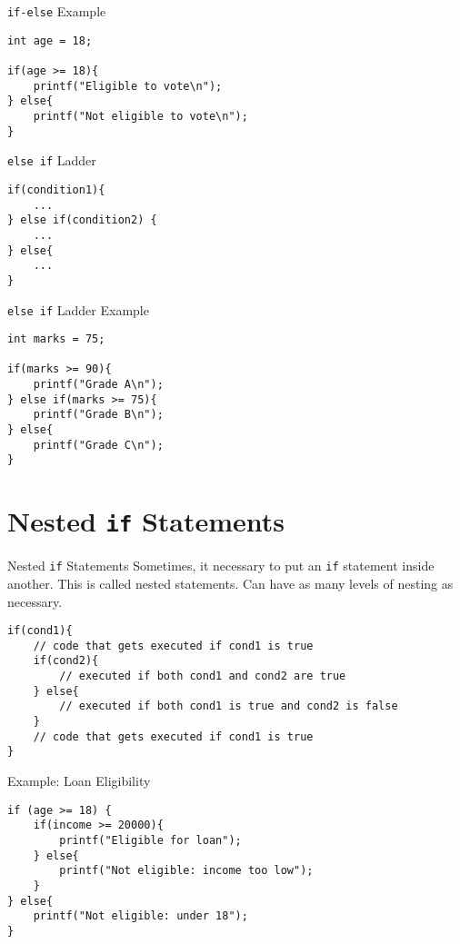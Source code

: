 \documentclass[12pt, aspectratio=169]{beamer}
\begin{document}
    \begin{frame}[fragile]{\texttt{if-else} Example}
        \begin{verbatim}
int age = 18;

if(age >= 18){
    printf("Eligible to vote\n");
} else{
    printf("Not eligible to vote\n");
}
        \end{verbatim}
    \end{frame}


    \begin{frame}[fragile]{\texttt{else if} Ladder}
        \begin{verbatim}
if(condition1){
    ...
} else if(condition2) {
    ...
} else{
    ...
}
        \end{verbatim}
    \end{frame}


    \begin{frame}[fragile]{\texttt{else if} Ladder Example}
        \begin{verbatim}
int marks = 75;

if(marks >= 90){
    printf("Grade A\n");
} else if(marks >= 75){
    printf("Grade B\n");
} else{
    printf("Grade C\n");
}
        \end{verbatim}
    \end{frame}


    \section{Nested \texttt{if} Statements}

    \begin{frame}[fragile]{Nested \texttt{if} Statements}
        Sometimes, it necessary to put an \texttt{if} statement inside another. This is called nested statements. Can have as many levels of nesting as necessary.

        \begin{verbatim}
if(cond1){
    // code that gets executed if cond1 is true
    if(cond2){
        // executed if both cond1 and cond2 are true
    } else{
        // executed if both cond1 is true and cond2 is false
    }
    // code that gets executed if cond1 is true
}
        \end{verbatim}
    \end{frame}


    \begin{frame}[fragile]{Example: Loan Eligibility}
        \begin{verbatim}
if (age >= 18) {
    if(income >= 20000){
        printf("Eligible for loan");
    } else{
        printf("Not eligible: income too low");
    }
} else{
    printf("Not eligible: under 18");
}
        \end{verbatim}
    \end{frame}
\end{document}
